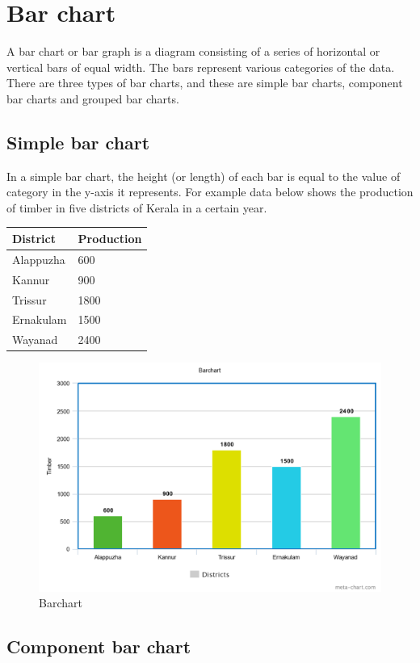 \documentclass[
]{book}
\begin{document}
\hypertarget{bar-chart}{%
\section{Bar chart}\label{bar-chart}}

A bar chart or bar graph is a diagram consisting of a series of horizontal or vertical bars of equal width. The bars represent various categories of the data. There are three types of bar charts, and these are simple bar charts, component bar charts and grouped bar charts.

\hypertarget{simple-bar-chart}{%
\subsection{Simple bar chart}\label{simple-bar-chart}}

In a simple bar chart, the height (or length) of each bar is equal to the value of category in the y-axis it represents. For example data below shows the production of timber in five districts of Kerala in a certain year.

\begin{longtable}[]{@{}ll@{}}
\toprule
District & Production \\
\midrule
\endhead
Alappuzha & 600 \\
Kannur & 900 \\
Trissur & 1800 \\
Ernakulam & 1500 \\
Wayanad & 2400 \\
\bottomrule
\end{longtable}

\begin{figure}

{\centering \includegraphics[width=0.5\linewidth]{images/image13} 

}

\caption{Barchart}\label{fig:bar}
\end{figure}

\hypertarget{component-bar-chart}{%
\subsection{Component bar chart}\label{component-bar-chart}}
\end{document}
